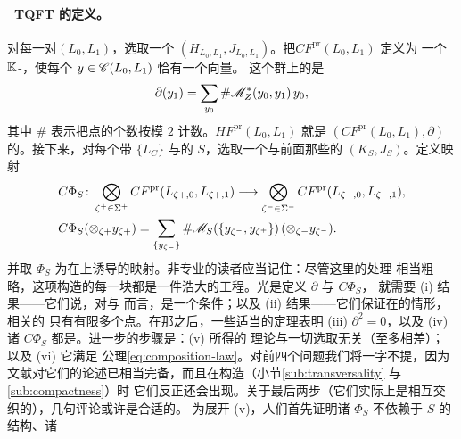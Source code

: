 \paragraph{~TQFT 的定义。}\label{sub:tqft-definition}
对每一对\trExact\trLagrange\trSubmanifold{}$(L_0,L_1)$，选取一个\trRegular\trFloerDatum{}%
$(H_{L_0,L_1},J_{L_0,L_1})$。把\trFloerCochainGroup{}$CF^{\mathrm{pr}}(L_0,L_1)$ 定义为
一个 $\mathbb{K}$-\trVectorSpace，使每个 $y\in\mathscr{C}(L_0,L_1)$ 恰有一个\trBasis{}向量。
这个群上的\trBoundaryOperator{}是
\begin{equation}\label{eq:boundary-operator}
\partial(y_1)=\sum_{y_0}\#\mathscr{M}^*_Z(y_0,y_1)\,y_0,
\end{equation}
其中 $\#$ 表示把\trIsolated{}点的个数按模 $2$ 计数。$HF^{\mathrm{pr}}(L_0,L_1)$ 就是
$(CF^{\mathrm{pr}}(L_0,L_1),\partial)$ 的\trCohomology。接下来，对每个带%
\trLagrange\trLabel{}$\{L_C\}$ 与\trStriplikeEnd{}的\trPointedBoundary\trRiemann%
\trSurface{}$S$，选取一个与前面那些\trFloerDatum{}\trCompatible{}的%
\trRegular\trPerturbationDatum{}$(K_S,J_S)$。定义映射
\begin{equation}\label{eq:cphi-map}
\begin{aligned}
&C\Phi_S\colon
\bigotimes_{\zeta^+\in\Sigma^+}CF^{\mathrm{pr}}(L_{\zeta+,0},L_{\zeta+,1})
\longrightarrow
\bigotimes_{\zeta^-\in\Sigma^-}CF^{\mathrm{pr}}(L_{\zeta-,0},L_{\zeta-,1}),\\
&C\Phi_S(\otimes_{\zeta+}y_{\zeta+})
=\sum_{\{y_{\zeta-}\}}\#\mathscr{M}_S(\{y_{\zeta^-},y_{\zeta^+}\})\,(\otimes_{\zeta-}y_{\zeta^-}).
\end{aligned}
\end{equation}
并取 $\Phi_S$ 为在\trCohomology{}上诱导的映射。非专业的读者应当记住：尽管这里的处理
相当粗略，这项构造的每一块都是一件浩大的工程。光是定义 $\partial$ 与 $C\Phi_S$，
就需要 (i) \trTransversality{}结果——它们说，对\trFloerDatum{}与%
\trPerturbationDatum{}而言，\trRegularity{}是一个\trGeneric{}条件；以及
(ii) \trCompactness{}结果——它们保证在\trRegular{}的情形，相关的\trModuliSpace{}%
只有有限多个\trIsolated{}点。在那之后，一些适当的\trGluing{}定理表明 (iii)
$\partial^2=0$，以及 (iv) 诸 $C\Phi_S$ 都是\trChainMap。进一步的步骤是：(v) 所得的
理论与一切选取无关（至多相差\trCanonical\trIsomorphism）；以及 (vi) 它满足%
\trComposition{}公理\eqref{eq:composition-law}。对前四个问题我们将一字不提，因为
文献对它们的论述已相当完备，而且在构造\trFukayaCategory{}（小节\cref{sub:transversality} 与\cref{sub:compactness}）时
它们反正还会出现。关于最后两步（它们实际上是相互交织的），几句评论或许是合适的。
为展开 (v)，人们首先证明诸 $\Phi_S$ 不依赖于 $S$ 的\trConformal{}结构、诸%
